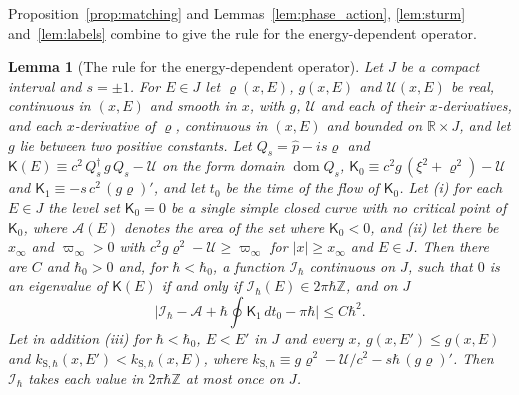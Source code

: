 \documentclass[aps,prd,onecolumn,tightenlines,nofootinbib,notitlepage,11pt,floatfix]{revtex4-2}
\theoremstyle{indentedtheorem}
\newtheorem{lemma}{Lemma}
\begin{document}
Proposition~\ref{prop:matching} and Lemmas~\ref{lem:phase_action}, \ref{lem:sturm} and~\ref{lem:labels} combine to give the rule for the energy-dependent operator.

\begin{lemma}[The rule for the energy-dependent operator]\label{lem:scalar_rule}
Let $J$ be a compact interval and $s=\pm1$. For $E\in J$ let $\varrho(x,E)$, $g(x,E)$ and $\mathcal{U}(x,E)$ be real, continuous in $(x,E)$ and smooth in $x$, with $g$, $\mathcal{U}$ and each of their $x$-derivatives, and each $x$-derivative of $\varrho$, continuous in $(x,E)$ and bounded on $\mathbb{R}\times J$, and let $g$ lie between two positive constants. Let $Q_s=\hat{p}-is\varrho$ and $\mathsf{K}(E)\equiv c^2\,Q_s^\dagger\,g\,Q_s-\mathcal{U}$ on the form domain $\operatorname{dom}Q_s$, $\mathsf{K}_0\equiv c^2g\,(\xi^2+\varrho^2)-\mathcal{U}$ and $\mathsf{K}_1\equiv-s\,c^2\,(g\varrho)'$, and let $t_0$ be the time of the flow of $\mathsf{K}_0$. Let (i) for each $E\in J$ the level set $\mathsf{K}_0=0$ be a single simple closed curve with no critical point of $\mathsf{K}_0$, where $\mathcal{A}(E)$ denotes the area of the set where $\mathsf{K}_0<0$, and (ii) let there be $x_\infty$ and $\varpi_\infty>0$ with $c^2g\varrho^2-\mathcal{U}\geq\varpi_\infty$ for $|x|\geq x_\infty$ and $E\in J$. Then there are $C$ and $\hbar_0>0$ and, for $\hbar<\hbar_0$, a function $\mathcal{I}_\hbar$ continuous on $J$, such that $0$ is an eigenvalue of $\mathsf{K}(E)$ if and only if $\mathcal{I}_\hbar(E)\in2\pi\hbar\mathbb{Z}$, and on $J$
\begin{equation*}
    \Big|\mathcal{I}_\hbar-\mathcal{A}+\hbar\oint\mathsf{K}_1\,dt_0-\pi\hbar\Big| \leq C\hbar^2 .
\end{equation*}
Let in addition (iii) for $\hbar<\hbar_0$, $E<E'$ in $J$ and every $x$, $g(x,E')\leq g(x,E)$ and $k_{\text{S},\hbar}(x,E')<k_{\text{S},\hbar}(x,E)$, where $k_{\text{S},\hbar}\equiv g\varrho^2-\mathcal{U}/c^2-s\hbar\,(g\varrho)'$. Then $\mathcal{I}_\hbar$ takes each value in $2\pi\hbar\mathbb{Z}$ at most once on $J$.
\end{lemma}
\end{document}
